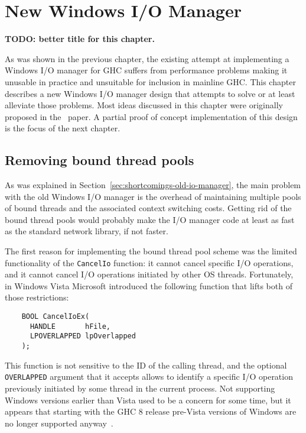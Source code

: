 \documentclass[a4paper,11pt,oneside]{report}
\begin{document}
\chapter{New Windows I/O Manager}
\label{chap:new-io-manager}

\textbf{TODO: better title for this chapter.}

As was shown in the previous chapter, the existing attempt at implementing a
Windows I/O manager for GHC suffers from performance problems making it unusable
in practice and unsuitable for inclusion in mainline GHC. This chapter describes
a new Windows I/O manager design that attempts to solve or at least alleviate
those problems. Most ideas discussed in this chapter were originally proposed in
the~\cite{bib:voellmy} paper. A partial proof of concept implementation of this
design is the focus of the next chapter.

\section{Removing bound thread pools}

As was explained in Section~\ref{sec:shortcomings-old-io-manager}, the main
problem with the old Windows I/O manager is the overhead of maintaining multiple
pools of bound threads and the associated context switching costs. Getting rid
of the bound thread pools would probably make the I/O manager code at least as
fast as the standard network library, if not faster.

The first reason for implementing the bound thread pool scheme was the limited
functionality of the \texttt{CancelIo} function: it cannot cancel specific I/O
operations, and it cannot cancel I/O operations initiated by other OS
threads. Fortunately, in Windows Vista Microsoft introduced the following
function that lifts both of those restrictions:

\begin{verbatim}
    BOOL CancelIoEx(
      HANDLE       hFile,
      LPOVERLAPPED lpOverlapped
    );
\end{verbatim}

This function is not sensitive to the ID of the calling thread, and the optional
\texttt{OVERLAPPED} argument that it accepts allows to identify a specific I/O
operation previously initiated by some thread in the current process. Not
supporting Windows versions earlier than Vista used to be a concern for some
time, but it appears that starting with the GHC 8 release pre-Vista versions of
Windows are no longer supported anyway~\cite{bib:ghc-wiki-windows-ghc}.
\end{document}
